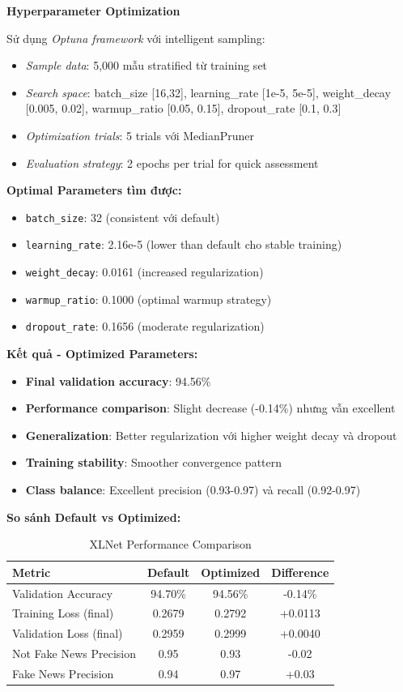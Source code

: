 \textbf{Hyperparameter Optimization}

Sử dụng \textit{Optuna framework} với intelligent sampling:
\begin{itemize}
    \item \textit{Sample data}: 5,000 mẫu stratified từ training set
    \item \textit{Search space}: batch\_size [16,32], learning\_rate [1e-5, 5e-5], weight\_decay [0.005, 0.02], warmup\_ratio [0.05, 0.15], dropout\_rate [0.1, 0.3]
    \item \textit{Optimization trials}: 5 trials với MedianPruner
    \item \textit{Evaluation strategy}: 2 epochs per trial for quick assessment
\end{itemize}
\newpage
\textbf{Optimal Parameters tìm được:}
\begin{itemize}
    \item \texttt{batch\_size}: 32 (consistent với default)
    \item \texttt{learning\_rate}: 2.16e-5 (lower than default cho stable training)
    \item \texttt{weight\_decay}: 0.0161 (increased regularization)
    \item \texttt{warmup\_ratio}: 0.1000 (optimal warmup strategy)
    \item \texttt{dropout\_rate}: 0.1656 (moderate regularization)
\end{itemize}

\textbf{Kết quả - Optimized Parameters:}
\begin{itemize}
    \item \textbf{Final validation accuracy}: 94.56\% 
    \item \textbf{Performance comparison}: Slight decrease (-0.14\%) nhưng vẫn excellent
    \item \textbf{Generalization}: Better regularization với higher weight decay và dropout
    \item \textbf{Training stability}: Smoother convergence pattern
    \item \textbf{Class balance}: Excellent precision (0.93-0.97) và recall (0.92-0.97)
\end{itemize}

\textbf{So sánh Default vs Optimized:}

\begin{table}[h]
\centering
\begin{tabular}{|l|c|c|c|}
\hline
\textbf{Metric} & \textbf{Default} & \textbf{Optimized} & \textbf{Difference} \\
\hline
Validation Accuracy & 94.70\% & 94.56\% & -0.14\% \\
Training Loss (final) & 0.2679 & 0.2792 & +0.0113 \\
Validation Loss (final) & 0.2959 & 0.2999 & +0.0040 \\
Not Fake News Precision & 0.95 & 0.93 & -0.02 \\
Fake News Precision & 0.94 & 0.97 & +0.03 \\
\hline
\end{tabular}
\caption{XLNet Performance Comparison}
\end{table}

